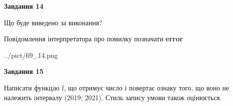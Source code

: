 \documentclass[11pt, ukrainian]{article}
\begin{document}
{\begin {large}
{\begin {center}\textbf{Завдання 14}\end {center}}\par
Що буде виведено за виконання? \par
Повідомлення інтерпретатора про помилку позначати \textbf{error}

\begin{center}
	{../pict/69_14.png}
\end{center}
\newpage

{\begin {center}\textbf{Завдання 15}\end {center}}\par

Написати функцiю f, що отримує число і повертає ознаку того, що воно не належить iнтервалу (2019; 2021). Стиль запису умови також оцінюється.\par
\newpage

\end {large}}
\end{document}
